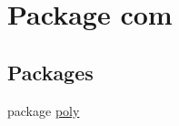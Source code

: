 \hypertarget{namespacecom}{\section{Package com}
\label{namespacecom}
}
\subsection*{Packages}
\begin{DoxyCompactItemize}
\item 
package \hyperlink{namespacecom_1_1poly}{poly}
\end{DoxyCompactItemize}

